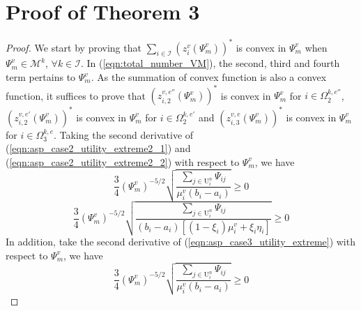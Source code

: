 \documentclass[10pt,journal, compsoc]{IEEEtran}
\begin{document}
  \section{Proof of Theorem 3}\label{appendix:theorem_3}
    \begin{proof}
    We start by proving that $\sum_{i \in \mathcal{I}} (z_{i}^v(\Psi_m^v))^*$ is convex in $\Psi_m^v$ when $\Psi_m^v \in \mathcal{M}^k,\, \forall k \in \mathcal{I}$. In (\ref{eqn:total_number_VM}), the second, third and fourth term pertains to $\Psi_m^v$. As the summation of convex function is also a convex function, it suffices to prove that $(z_{i,2}^{v,e''}(\Psi_m^v))^*$ is convex in $\Psi_m^v$ for $i \in \Omega_2^{k,e''}$, $(z_{i,2}^{v,e'}(\Psi_m^v))^*$ is convex in $\Psi_m^v$ for $i \in \Omega_2^{k,e'}$ and $(z_{i,3}^{v,e}(\Psi_m^v))^*$ is convex in $\Psi_m^v$ for $i \in \Omega_3^{k,e}$. Taking the second derivative of (\ref{eqn:asp_case2_utility_extreme2_1}) and (\ref{eqn:asp_case2_utility_extreme2_2}) with respect to $\Psi_m^v$, we have
    \begin{equation}
    \frac{3}{4}(\Psi_m^v)^{-5/2}\sqrt{\frac{\sum_{j \in \mathrm{U}_i^n}\Psi_{ij}}{\mu_i^v(b_i-a_i)}} \geq 0
    \end{equation}
    \begin{equation}
    \frac{3}{4}(\Psi_m^v)^{-5/2}\sqrt{\frac{\sum_{j \in \mathrm{U}_i^n}\Psi_{ij}}{(b_i-a_i)[(1-\xi_i)\mu_i^v + \xi_i \eta_i]}} \geq 0
    \end{equation}
    In addition, take the second derivative of (\ref{eqn:asp_case3_utility_extreme}) with respect to $\Psi_m^v$, we have
    \begin{equation}
    \frac{3}{4}(\Psi_m^v)^{-5/2}\sqrt{\frac{\sum_{j \in \mathrm{U}_i^n}\Psi_{ij}}{\mu_i^v(b_i-a_i)}} \geq 0
    \end{equation}
    

\end{proof}
\end{document}

